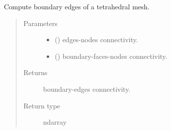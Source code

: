 \documentclass[letterpaper,10pt,english]{sphinxmanual}
\begin{document}

\begin{fulllineitems}
\label{\detokenize{petgem/mesh:petgem.mesh.computeBoundaryEdges}}
Compute boundary edges of a tetrahedral mesh.
\begin{quote}\begin{description}
\item[{Parameters}] \leavevmode\begin{itemize}
\item {} 
 () \textendash{} edges-nodes connectivity.

\item {} 
 () \textendash{} boundary-faces-nodes connectivity.

\end{itemize}

\item[{Returns}] \leavevmode
boundary-edges connectivity.

\item[{Return type}] \leavevmode
ndarray

\end{description}\end{quote}

\end{fulllineitems}

\end{document}
